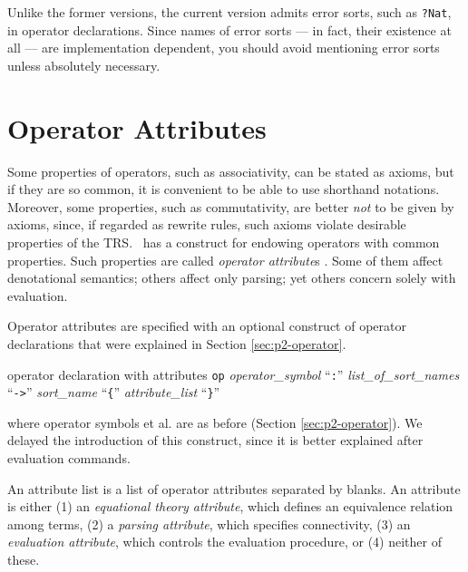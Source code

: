 \documentclass[a4paper]{memoir}
\begin{document}
\begin{warning}
  Unlike the former versions, the current version admits error sorts,
  such as \verb|?Nat|, in operator declarations.
  Since names of error sorts --- in fact, their
  existence at all --- are implementation dependent,
  you should avoid mentioning error sorts unless absolutely necessary.
\end{warning}

\chapter{Operator Attributes}\label{sec:p2-op-properties}

Some properties of operators, such as associativity, can be stated as
axioms, but if they are so common, it is convenient to be able to
use shorthand notations. Moreover, some properties, such as
commutativity, are better {\em not} to be given by axioms,
since, if regarded as rewrite rules, such axioms violate
desirable properties of the TRS. \cafeobj~has a construct for endowing
operators with common properties. Such properties are called
{\em operator attribute\/}s
. Some of them
affect denotational semantics; others affect only parsing; yet others
concern solely with evaluation.

Operator attributes are specified with an optional construct of
operator declarations that were explained in Section \ref{sec:p2-operator}.

\begin{bsyntax} operator declaration with attributes  \Hline
\texttt{op} \textit{operator\_symbol} ``\texttt{:}'' \textit{list\_of\_sort\_names} ``\texttt{->}'' \textit{sort\_name} ``\texttt{\{}'' \textit{attribute\_list} ``\texttt{\}}''
\end{bsyntax}

where operator symbols et al. are as before (Section \ref{sec:p2-operator}).
We delayed the introduction of this construct, since it is
better explained after evaluation commands.

An attribute list is a list of operator attributes separated by blanks.
An attribute is either (1) an {\em equational theory attribute},
 which defines an equivalence relation
among terms, (2) a {\em parsing attribute}, which
specifies connectivity,
(3) an {\em evaluation attribute}, which controls the evaluation
procedure, or (4) neither of these.
\end{document}
